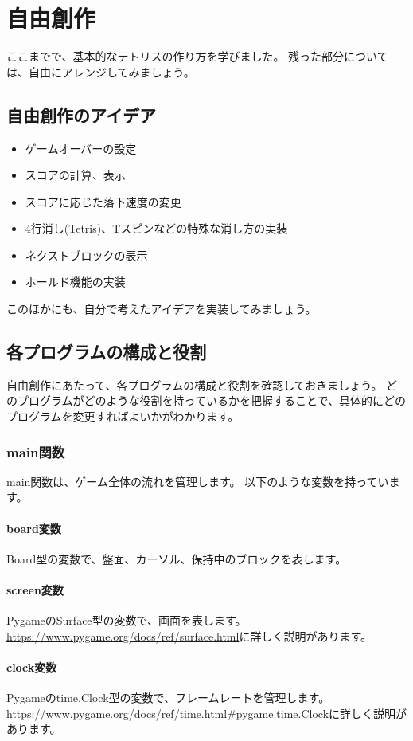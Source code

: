 \chapter{自由創作}
ここまでで、基本的なテトリスの作り方を学びました。
残った部分については、自由にアレンジしてみましょう。
\section{自由創作のアイデア}
\begin{itemize}
  \item ゲームオーバーの設定
  \item スコアの計算、表示
  \item スコアに応じた落下速度の変更
  \item 4行消し(Tetris)、Tスピンなどの特殊な消し方の実装
  \item ネクストブロックの表示
  \item ホールド機能の実装
\end{itemize}
このほかにも、自分で考えたアイデアを実装してみましょう。

\section{各プログラムの構成と役割}
自由創作にあたって、各プログラムの構成と役割を確認しておきましょう。
どのプログラムがどのような役割を持っているかを把握することで、具体的にどのプログラムを変更すればよいかがわかります。

\subsection{main関数}
main関数は、ゲーム全体の流れを管理します。
以下のような変数を持っています。
\subsubsection{board変数}
Board型の変数で、盤面、カーソル、保持中のブロックを表します。
\subsubsection{screen変数}
PygameのSurface型の変数で、画面を表します。
\url{https://www.pygame.org/docs/ref/surface.html}に詳しく説明があります。
\subsubsection{clock変数}
Pygameのtime.Clock型の変数で、フレームレートを管理します。
\url{https://www.pygame.org/docs/ref/time.html#pygame.time.Clock}に詳しく説明があります。
